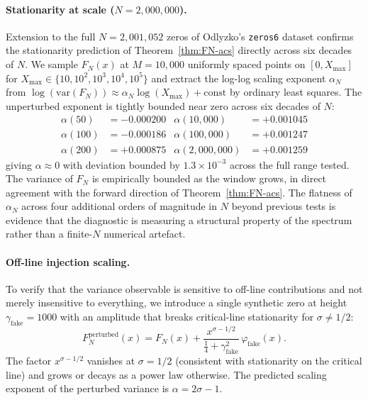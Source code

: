 \documentclass[11pt,a4paper]{article}
\theoremstyle{plain}
\theoremstyle{definition}
\theoremstyle{remark}
\begin{document}
\paragraph{Stationarity at scale ($N = 2{,}000{,}000$).}
Extension to the full $N = 2{,}001{,}052$ zeros of Odlyzko's
\texttt{zeros6} dataset confirms the stationarity prediction of
Theorem~\ref{thm:FN-acs} directly across six decades of $N$. We
sample $F_N(x)$ at $M = 10{,}000$ uniformly spaced points on
$[0, X_{\max}]$ for $X_{\max} \in \{10, 10^2, 10^3, 10^4, 10^5\}$
and extract the log-log scaling exponent
$\alpha_N$ from $\log(\mathrm{var}(F_N)) \approx
\alpha_N \log(X_{\max}) + \text{const}$ by ordinary least squares.
The unperturbed exponent is tightly bounded near zero across six
decades of $N$:
\begin{align*}
\alpha(50) &= -0.000200 & \alpha(10{,}000) &= +0.001045 \\
\alpha(100) &= -0.000186 & \alpha(100{,}000) &= +0.001247 \\
\alpha(200) &= +0.000875 & \alpha(2{,}000{,}000) &= +0.001259
\end{align*}
giving $\alpha \approx 0$ with deviation bounded by
$1.3 \times 10^{-3}$ across the full range tested. The variance of
$F_N$ is empirically bounded as the window grows, in direct
agreement with the forward direction of
Theorem~\ref{thm:FN-acs}. The flatness of $\alpha_N$ across four
additional orders of magnitude in $N$ beyond previous tests is
evidence that the diagnostic is measuring a structural property
of the spectrum rather than a finite-$N$ numerical artefact.

\paragraph{Off-line injection scaling.}
To verify that the variance observable is sensitive to off-line
contributions and not merely insensitive to everything, we
introduce a single synthetic zero at height
$\gamma_{\mathrm{fake}} = 1000$ with an amplitude that breaks
critical-line stationarity for $\sigma \neq 1/2$:
\begin{equation}
F_N^{\mathrm{perturbed}}(x) = F_N(x) +
\frac{x^{\sigma - 1/2}}{\frac{1}{4} + \gamma_{\mathrm{fake}}^2}
\,\varphi_{\mathrm{fake}}(x).
\end{equation}
The factor $x^{\sigma - 1/2}$ vanishes at $\sigma = 1/2$
(consistent with stationarity on the critical line) and grows or
decays as a power law otherwise. The predicted scaling exponent
of the perturbed variance is $\alpha = 2\sigma - 1$.
\end{document}
